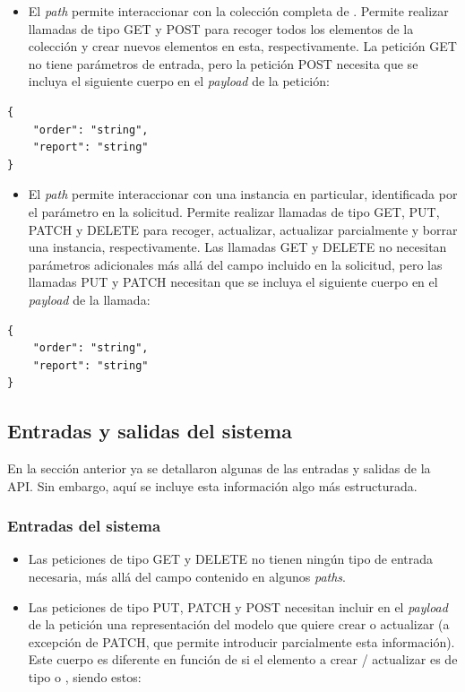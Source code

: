\begin{itemize}
    \item El \emph{path}  permite interaccionar con la colección completa de . Permite realizar llamadas de tipo GET y POST para recoger todos los elementos de la colección y crear nuevos elementos en esta, respectivamente. La petición GET no tiene parámetros de entrada, pero la petición POST necesita que se incluya el siguiente cuerpo en el \emph{payload} de la petición:
\end{itemize}

\begin{lstlisting}
{
    "order": "string",
    "report": "string"
}
\end{lstlisting}

\begin{itemize}
    \item El \emph{path}  permite interaccionar con una instancia  en particular, identificada por el parámetro  en la solicitud. Permite realizar llamadas de tipo GET, PUT, PATCH y DELETE para recoger, actualizar, actualizar parcialmente y borrar una instancia, respectivamente. Las llamadas GET y DELETE no necesitan parámetros adicionales más allá del campo  incluido en la solicitud, pero las llamadas PUT y PATCH necesitan que se incluya el siguiente cuerpo en el \emph{payload} de la llamada:
\end{itemize}

\begin{lstlisting}
{
    "order": "string",
    "report": "string"
}
\end{lstlisting}

\subsection{Entradas y salidas del sistema}

En la sección anterior ya se detallaron algunas de las entradas y salidas de la API. Sin embargo, aquí se incluye esta información algo más estructurada.

\subsubsection{Entradas del sistema}

\begin{itemize}
    \item Las peticiones de tipo GET y DELETE no tienen ningún tipo de entrada necesaria, más allá del campo  contenido en algunos \emph{paths}.
    \item Las peticiones de tipo PUT, PATCH y POST necesitan incluir en el \emph{payload} de la petición una representación del modelo que quiere crear o actualizar (a excepción de PATCH, que permite introducir parcialmente esta información). Este cuerpo es diferente en función de si el elemento a crear / actualizar es de tipo  o , siendo estos:
\end{itemize}

